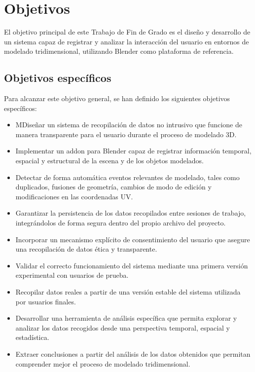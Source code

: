 \chapter{Objetivos}

El objetivo principal de este Trabajo de Fin de Grado es el diseño y desarrollo de un sistema capaz de registrar y analizar la interacción del usuario en entornos de modelado tridimensional, utilizando Blender como plataforma de referencia.

\section{Objetivos específicos}

Para alcanzar este objetivo general, se han definido los siguientes objetivos específicos:

\begin{itemize}
    \item MDiseñar un sistema de recopilación de datos no intrusivo que funcione de manera transparente para el usuario durante el proceso de modelado 3D.
    \item Implementar un addon para Blender capaz de registrar información temporal, espacial y estructural de la escena y de los objetos modelados.
    \item Detectar de forma automática eventos relevantes de modelado, tales como duplicados, fusiones de geometría, cambios de modo de edición y modificaciones en las coordenadas UV.
    \item Garantizar la persistencia de los datos recopilados entre sesiones de trabajo, integrándolos de forma segura dentro del propio archivo del proyecto.
    \item Incorporar un mecanismo explícito de consentimiento del usuario que asegure una recopilación de datos ética y transparente.
    \item Validar el correcto funcionamiento del sistema mediante una primera versión experimental con usuarios de prueba.
    \item Recopilar datos reales a partir de una versión estable del sistema utilizada por usuarios finales.
    \item Desarrollar una herramienta de análisis específica que permita explorar y analizar los datos recogidos desde una perspectiva temporal, espacial y estadística.
    \item Extraer conclusiones a partir del análisis de los datos obtenidos que permitan comprender mejor el proceso de modelado tridimensional.
\end{itemize}
